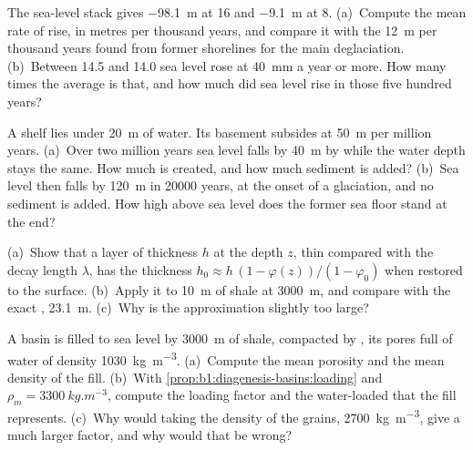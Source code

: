 \begin{exercise}[$\star\star$]\label{exo:b1:diagenesis-basins:8}
The sea-level stack gives \qty{-98.1}{m} at \qty{16}{\ka} and \qty{-9.1}{m} at
\qty{8}{\ka}. (a)~Compute the mean rate of rise, in metres per thousand years,
and compare it with the \qty{12}{m} per thousand years found from former
shorelines for the main deglaciation. (b)~Between \qty{14.5}{\ka} and
\qty{14.0}{\ka} sea level rose at \qty{40}{mm} a year or more. How many times
the average is that, and how much did sea level rise in those five hundred
years?
\end{exercise}

\begin{exercise}[$\star\star$]\label{exo:b1:diagenesis-basins:9}
A shelf lies under \qty{20}{m} of water. Its basement subsides at
\qty{50}{m} per million years. (a)~Over two million years sea level falls by
\qty{40}{m} by  while the water depth stays the same. How much
 is created, and how much sediment is added? (b)~Sea level then
falls by \qty{120}{m} in \num{20000} years, at the onset of a glaciation, and no
sediment is added. How high above sea level does the former sea floor stand at
the end?
\end{exercise}

\begin{exercise}[$\star\star\star$]\label{exo:b1:diagenesis-basins:10}
(a)~Show that a layer of thickness $h$ at the depth $z$, thin compared with the
decay length $\lambda$, has the thickness $h_0 \approx h\,(1 - \varphi(z))/(1 -
\varphi_0)$ when restored to the surface. (b)~Apply it to \qty{10}{m} of shale
at \qty{3000}{m}, and compare with the exact , \qty{23.1}{m}.
(c)~Why is the approximation slightly too large?
\end{exercise}

\begin{exercise}[$\star\star\star$]\label{exo:b1:diagenesis-basins:11}
A basin is filled to sea level by \qty{3000}{m} of shale, compacted by , its pores full of water of density \qty{1030}{kg.m^{-3}}. (a)~Compute the
mean porosity and the mean density of the fill. (b)~With
\cref{prop:b1:diagenesis-basins:loading} and $\rho_m =
\qty{3300}{kg.m^{-3}}$, compute the loading factor and the water-loaded
 that the fill represents. (c)~Why would taking the density of the
grains, \qty{2700}{kg.m^{-3}}, give a much larger factor, and why would that be
wrong?
\end{exercise}

